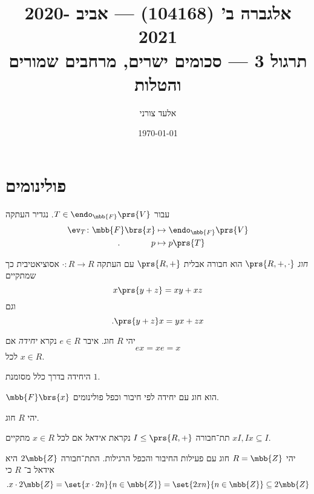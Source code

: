 \documentclass[a4paper,10pt,oneside,openany]{article}
\title{
אלגברה ב' (104168) \textenglish{---} אביב 2020-2021
\\
תרגול 3 \textenglish{---} סכומים ישרים, מרחבים שמורים והטלות
}
\author{אלעד צורני}
\date{\today}
\begin{document}
\maketitle

\section{פולינומים}

\begin{definition}
עבור
$T \in \endo_{\mbb{F}}\prs{V}$.
נגדיר העתקה
\begin{align*}
\ev_T \colon \mbb{F}\brs{x} &\mapsto \endo_{\mbb{F}}\prs{V} \\
\text{.} \hphantom{lalalalal} p &\mapsto p\prs{T}
\end{align*}
\end{definition}

\begin{definition}[חוג]
\emph{חוג}
$\prs{R, +, \cdot}$
הוא חבורה אבלית
$\prs{R, +}$
עם העתקה
$\cdot \colon R \to R$
אסוציאטיבית כך שמתקיים
\[x \prs{y+z} = xy + xz\]
וגם
\[\text{.} \prs{y+z}x = yx + zx\]
\end{definition}

\begin{definition}[יחידה]
יהי
$R$
חוג.
איבר
$e \in R$
נקרא
\emph{יחידה}
אם
\[ex = xe = x\]
לכל
$x \in R$.

היחידה בדרך כלל מסומנת
$1$.
\end{definition}

\begin{example}
$\mbb{F}\brs{x}$
הוא חוג עם יחידה לפי חיבור וכפל פולינומים.
\end{example}

\begin{example}

\end{example}

\begin{definition}[אידאל]
יהי
$R$
חוג.

תת־חבורה
$I \leq \prs{R, +}$
נקראת
\emph{אידאל}
אם לכל
$x \in R$
מתקיים
$xI, Ix \subseteq I$.
\end{definition}

\begin{example}
יהי
$R = \mbb{Z}$
חוג עם פעילות החיבור והכפל הרגילות.
התת־חבורה
$2 \mbb{Z}$
היא אידאל ב־%
$R$
כי
\[\text{.} x \cdot 2 \mbb{Z} = \set{x \cdot 2 n}{n \in \mbb{Z}} = \set{2xn}{n \in \mbb{Z}} \subseteq 2\mbb{Z}\]
\end{example}
\end{document}
